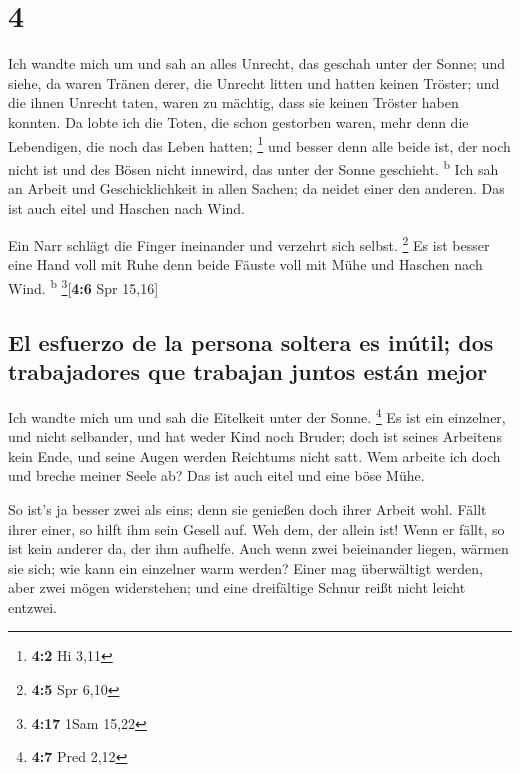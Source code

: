 \hypertarget{section-3}{%
\section{4}\label{section-3}}

 Ich wandte mich um und sah an alles Unrecht, das geschah
unter der Sonne; und siehe, da waren Tränen derer, die Unrecht litten
und hatten keinen Tröster; und die ihnen Unrecht taten, waren zu
mächtig, dass sie keinen Tröster haben konnten.  Da lobte
ich die Toten, die schon gestorben waren, mehr denn die Lebendigen, die
noch das Leben hatten; \footnote{\textbf{4:2} Hi 3,11} 
und besser denn alle beide ist, der noch nicht ist und des Bösen nicht
innewird, das unter der Sonne geschieht. \textsuperscript{b}
 Ich sah an Arbeit und Geschicklichkeit in allen Sachen;
da neidet einer den anderen. Das ist auch eitel und Haschen nach Wind.

 Ein Narr schlägt die Finger ineinander und verzehrt sich
selbst. \footnote{\textbf{4:5} Spr 6,10}  Es ist besser
eine Hand voll mit Ruhe denn beide Fäuste voll mit Mühe und Haschen nach
Wind. \textsuperscript{b} \footnote{\textbf{4:17} 1Sam 15,22}{[}\textbf{4:6}
Spr 15,16{]}

\hypertarget{el-esfuerzo-de-la-persona-soltera-es-inuxfatil-dos-trabajadores-que-trabajan-juntos-estuxe1n-mejor}{%
\subsection{El esfuerzo de la persona soltera es inútil; dos
trabajadores que trabajan juntos están
mejor}\label{el-esfuerzo-de-la-persona-soltera-es-inuxfatil-dos-trabajadores-que-trabajan-juntos-estuxe1n-mejor}}

 Ich wandte mich um und sah die Eitelkeit unter der Sonne.
\footnote{\textbf{4:7} Pred 2,12}  Es ist ein einzelner,
und nicht selbander, und hat weder Kind noch Bruder; doch ist seines
Arbeitens kein Ende, und seine Augen werden Reichtums nicht satt. Wem
arbeite ich doch und breche meiner Seele ab? Das ist auch eitel und eine
böse Mühe.

 So ist's ja besser zwei als eins; denn sie genießen doch
ihrer Arbeit wohl.  Fällt ihrer einer, so hilft ihm sein
Gesell auf. Weh dem, der allein ist! Wenn er fällt, so ist kein anderer
da, der ihm aufhelfe.  Auch wenn zwei beieinander liegen,
wärmen sie sich; wie kann ein einzelner warm werden? 
Einer mag überwältigt werden, aber zwei mögen widerstehen; und eine
dreifältige Schnur reißt nicht leicht entzwei.

